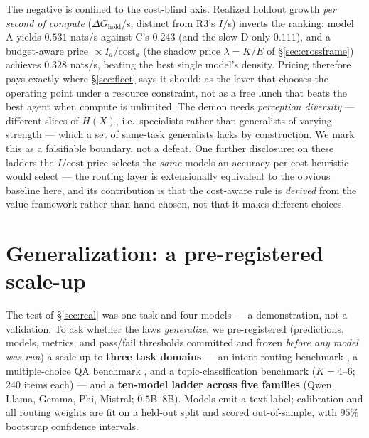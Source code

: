 \documentclass[11pt]{article}
\theoremstyle{plain}
\theoremstyle{definition}
\theoremstyle{remark}
\newcommand{\I}{I}
\begin{document}
The negative is confined to the cost-blind axis. Realized holdout growth \emph{per second of compute}
($\Delta G_{\text{hold}}/$s, distinct from R3's $\I/$s) inverts the ranking: model A
yields $0.531$ nats/s against C's $0.243$ (and the slow D only $0.111$), and a budget-aware price
$\propto \I_a/\text{cost}_a$ (the shadow price $\lambda=K/E$ of \S\ref{sec:crossframe}) achieves $0.328$ nats/s,
beating the best single model's density. Pricing therefore pays exactly where \S\ref{sec:fleet} says it should:
as the lever that chooses the operating point under a resource constraint, not as a free lunch that beats the
best agent when compute is unlimited. The demon needs \emph{perception diversity} --- different slices of $H(X)$,
i.e.\ specialists rather than generalists of varying strength --- which a set of same-task generalists lacks by
construction. We mark this as a falsifiable boundary, not a defeat. One further disclosure: on these ladders
the $\I/\mathrm{cost}$ price selects the \emph{same} models an accuracy-per-cost heuristic would select --- the
routing layer is extensionally equivalent to the obvious baseline here, and its contribution is that the
cost-aware rule is \emph{derived} from the value framework rather than hand-chosen, not that it makes different
choices.

\section{Generalization: a pre-registered scale-up}\label{sec:v2}

The test of \S\ref{sec:real} was one task and four models --- a demonstration, not a validation. To ask whether
the laws \emph{generalize}, we pre-registered (predictions, models, metrics, and pass/fail thresholds committed
and frozen \emph{before any model was run}) a scale-up to \textbf{three task domains} --- an intent-routing
benchmark \citep{larson2019clinc}, a multiple-choice QA benchmark \citep{hendrycks2021mmlu}, and a
topic-classification benchmark \citep{zhang2015agnews} ($K=4$--$6$; 240 items each) --- and a \textbf{ten-model ladder across five families} (Qwen, Llama, Gemma, Phi, Mistral;
$0.5$B--$8$B). Models emit a text label; calibration and all routing weights are fit on a held-out split and
scored out-of-sample, with $95\%$ bootstrap confidence intervals.
\end{document}

